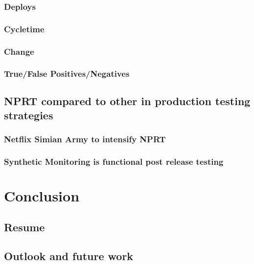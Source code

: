 \subsection{Deploys}
\subsection{Cycletime}
\subsection{Change}
\subsection{True/False Positives/Negatives}
\section{NPRT compared to other in production testing strategies}
\subsection{Netflix Simian Army to intensify NPRT}
\subsection{Synthetic Monitoring is functional post release testing}

\chapter{Conclusion}
\section{Resume}
\section{Outlook and future work}




